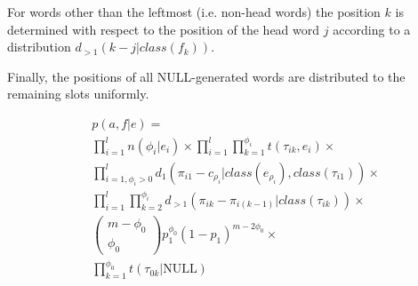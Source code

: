 For words other than the leftmost (i.e. non-head words) the position
$k$ is determined with respect to the position of the head word $j$
according to a distribution $d_{>1}(k-j|class(f_k))$.

Finally, the positions of all NULL-generated words are distributed
to the remaining slots uniformly.

\begin{eqnarray*}
 & p\left(a,f|e\right)=\\
 & \prod_{i=1}^{l}n\left(\phi_{i}|e_{i}\right)\times\prod_{i=1}^{l}\prod_{k=1}^{\phi_{i}}t\left(\tau_{ik},e_{i}\right)\times\\
 & \prod_{i=1,\phi_{i}>0}^{l}d_{1}\left(\pi_{i1}-c_{\rho_{i}}|class\left(e_{\rho_{i}}\right),class\left(\tau_{i1}\right)\right)\times\\
 & \prod_{i=1}^{l}\prod_{k=2}^{\phi_{i}}d_{>1}\left(\pi_{ik}-\pi_{i\left(k-1\right)}|class\left(\tau_{ik}\right)\right)\times\\
 & \left(\begin{array}{c}
m-\phi_{0}\\
\phi_{0}\end{array}\right)p_{1}^{\phi_{0}}\left(1-p_{1}\right)^{m-2\phi_{0}}\times\\
 & \prod_{k=1}^{\phi_{0}}t\left(\tau_{0k}|\text{NULL}\right)\end{eqnarray*}


